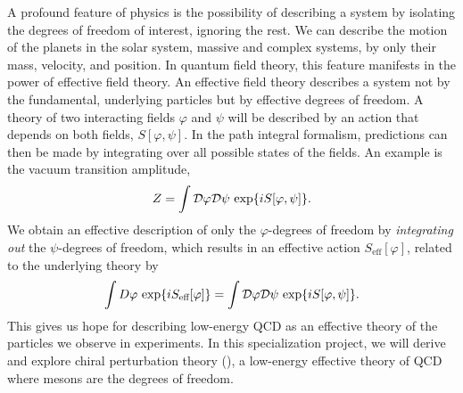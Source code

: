 A profound feature of physics is the possibility of describing a system by isolating the degrees of freedom of interest, ignoring the rest.
We can describe the motion of the planets in the solar system, massive and complex systems, by only their mass, velocity, and position.
In quantum field theory, this feature manifests in the power of effective field theory.
An effective field theory describes a system not by the fundamental, underlying particles but by effective degrees of freedom.
A theory of two interacting fields $\varphi$ and $\psi$ will be described by an action that depends on both fields, $S[\varphi, \psi]$.
In the path integral formalism, predictions can then be made by integrating over all possible states of the fields.
An example is the vacuum transition amplitude,
\begin{equation}
    Z = \int \mathcal{D} \varphi \mathcal{D} \psi \, \exp{i S[\varphi, \psi]}.
\end{equation}
We obtain an effective description of only the $\varphi$-degrees of freedom by \emph{integrating out} the $\psi$-degrees of freedom, which results in an effective action $S_\text{eff}[\varphi]$, related to the underlying theory by~\cite{Schwartz:QFT}
\begin{equation}
    \label{integrating out degrees of freedom}
    \int D \varphi \, \exp{i S_\text{eff}[\varphi]}
    =
    \int \mathcal{D} \varphi \mathcal{D} \psi \, \exp{i S[\varphi, \psi]}.
\end{equation}
This gives us hope for describing low-energy QCD as an effective theory of the particles we observe in experiments.
In this specialization project, we will derive and explore chiral perturbation theory (\chpt), a low-energy effective theory of QCD where mesons are the degrees of freedom.

